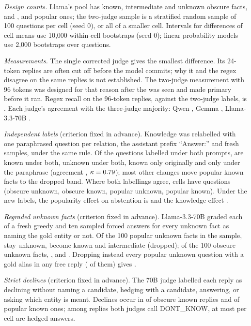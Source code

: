 \documentclass{article}
\begin{document}
\emph{Design counts.} Llama's pool has \lkObsPoolKnown{} known, \lkObsPoolMaybe{} intermediate and \lkObsPoolUnk{} unknown obscure facts, and \lkPopPoolKnown{}, \lkPopPoolMaybe{} and \lkPopPoolUnk{} popular ones; the two-judge sample is a stratified random sample of 100 questions per cell (seed 0), or all of a smaller cell. Intervals for differences of cell means use 10,000 within-cell bootstraps (seed 0); linear probability models use 2,000 bootstraps over questions.

\emph{Measurements.} The single corrected judge gives the smallest difference. Its 24-token replies are often cut off before the model commits; why it and the regex disagree on the same replies is not established. The two-judge measurement with 96 tokens was designed for that reason after the \hjLlamaDiff{} was seen and made primary before it ran. Regex recall on the 96-token replies, against the two-judge labels, is \hmLlamaRegexRecall. Each judge's agreement with the three-judge majority: Qwen \lkMajQwen, Gemma \lkMajGemma, Llama-3.3-70B \lkMajLlama.

\emph{Independent labels} (criterion fixed in advance). Knowledge was relabelled with one paraphrased question per relation, the assistant prefix ``Answer:'' and fresh samples, under the same rule. Of the \lcBothN{} questions labelled under both prompts, \lcKK{} are known under both, \lcUU{} unknown under both, \lcKU{} known only originally and \lcUK{} only under the paraphrase (agreement \lcAgree, $\kappa=0.79$); most other changes move popular known facts to the dropped band. Where both labellings agree, cells have \lcConsN{} questions (obscure unknown, obscure known, popular unknown, popular known). Under the new labels, the popularity effect on abstention is \eoPop{} \eoPopCI{} and the knowledge effect \eoKnow{} \eoKnowCI.

\emph{Regraded unknown facts} (criterion fixed in advance). Llama-3.3-70B graded each of a fresh greedy and ten sampled forced answers for every unknown fact as naming the gold entity or not. Of the 100 popular unknown facts in the sample, \sePUStay{} stay unknown, \sePUKnown{} become known and \sePUInter{} intermediate (dropped); of the 100 obscure unknown facts, \seOUStay{}, \seOUKnown{} and \seOUInter. Dropping instead every popular unknown question with a gold alias in any free reply (\lcPUAlias{} of them) gives \lcAliasDrop{} \lcAliasDropCI.

\emph{Strict declines} (criterion fixed in advance). The 70B judge labelled each reply as declining without naming a candidate, hedging with a candidate, answering, or asking which entity is meant. Declines occur in \sdObsKnown{} of obscure known replies and \sdPopKnown{} of popular known ones; among replies both judges call DONT\_KNOW, at most \sdHedgedMax{} per cell are hedged answers.
\end{document}
